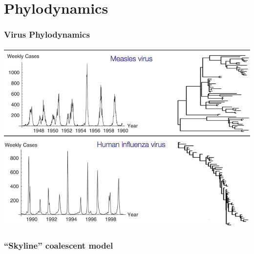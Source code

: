 \section{Phylodynamics}

\begin{frame}
\frametitle{Virus Phylodynamics}

\includegraphics[scale=0.35]{../common/images/virusPhylodynamics}
\end{frame}

\begin{frame}
\frametitle{``Skyline'' coalescent model}
\begin{centering}%
%
\par%
\end{centering}%
\end{frame}


